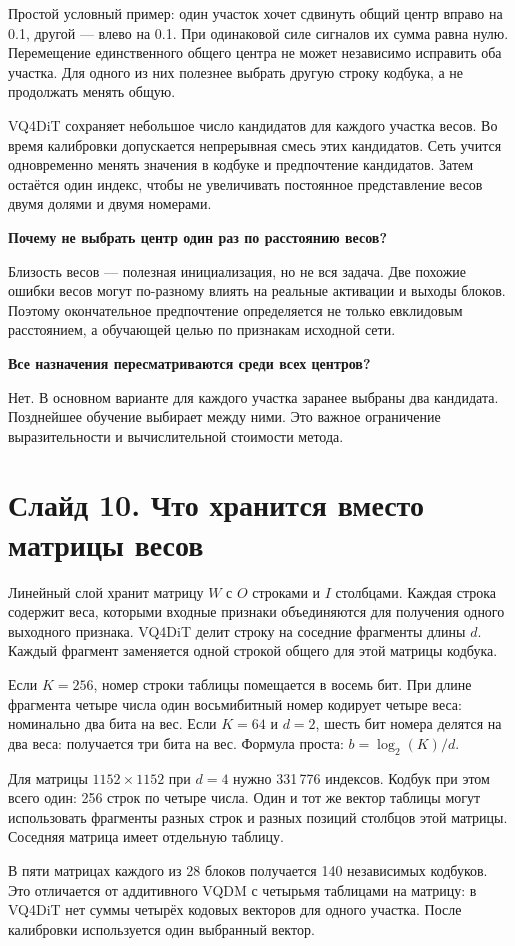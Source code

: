 \documentclass[a4paper,11pt]{article}
\newcommand{\slide}[2]{\clearpage\section*{Слайд #1. #2}}
\newcommand{\question}[1]{\par\textbf{#1}\par}
\begin{document}
Простой условный пример: один участок хочет сдвинуть общий центр вправо
на 0.1, другой --- влево на 0.1. При одинаковой силе сигналов их сумма
равна нулю. Перемещение единственного общего центра не может независимо
исправить оба участка. Для одного из них полезнее выбрать другую строку
кодбука, а не продолжать менять общую.

VQ4DiT сохраняет небольшое число кандидатов для каждого участка весов.
Во время калибровки допускается непрерывная смесь этих кандидатов.
Сеть учится одновременно менять значения в кодбуке и предпочтение
кандидатов. Затем остаётся один индекс, чтобы не увеличивать постоянное
представление весов двумя долями и двумя номерами.

\question{Почему не выбрать центр один раз по расстоянию весов?}
Близость весов --- полезная инициализация, но не вся задача.
Две похожие ошибки весов могут по-разному влиять на реальные активации
и выходы блоков. Поэтому окончательное предпочтение определяется
не только евклидовым расстоянием, а обучающей целью по признакам исходной сети.

\question{Все назначения пересматриваются среди всех центров?}
Нет. В основном варианте для каждого участка заранее выбраны два
кандидата. Позднейшее обучение выбирает между ними. Это важное
ограничение выразительности и вычислительной стоимости метода.

\slide{10}{Что хранится вместо матрицы весов}
Линейный слой хранит матрицу $W$ с $O$ строками и $I$ столбцами.
Каждая строка содержит веса, которыми входные признаки объединяются
для получения одного выходного признака. VQ4DiT делит строку
на соседние фрагменты длины $d$. Каждый фрагмент заменяется одной
строкой общего для этой матрицы кодбука.

Если $K=256$, номер строки таблицы помещается в восемь бит.
При длине фрагмента четыре числа один восьмибитный номер кодирует
четыре веса: номинально два бита на вес. Если $K=64$ и $d=2$,
шесть бит номера делятся на два веса: получается три бита на вес.
Формула проста: $b=\log_2(K)/d$.

Для матрицы $1152\times1152$ при $d=4$ нужно 331\,776 индексов.
Кодбук при этом всего один: 256 строк по четыре числа. Один и тот же
вектор таблицы могут использовать фрагменты разных строк и разных
позиций столбцов этой матрицы. Соседняя матрица имеет отдельную таблицу.

В пяти матрицах каждого из 28 блоков получается 140 независимых кодбуков.
Это отличается от аддитивного VQDM с четырьмя таблицами на матрицу:
в VQ4DiT нет суммы четырёх кодовых векторов для одного участка.
После калибровки используется один выбранный вектор.
\end{document}
